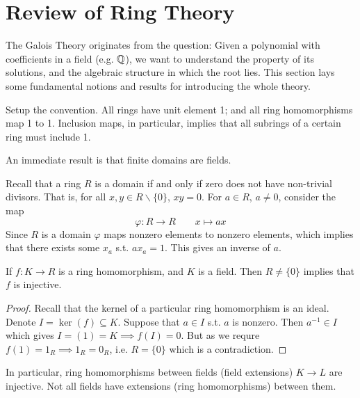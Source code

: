 \documentclass{article}
\begin{document}

\tableofcontents
\newpage

\section{Review of Ring Theory}

\textstart
The Galois Theory originates from the question: Given a polynomial with coefficients in a field (e.g. $\mathbb{Q}$), we want to understand the property of its solutions, and the algebraic structure in which the root lies. This section lays some fundamental notions and results for introducing the whole theory.

Setup the convention. All rings have unit element 1; and all ring homomorphisms map 1 to 1. Inclusion maps, in particular, implies that all subrings of a certain ring must include 1.

\begin{remark}
    An immediate result is that finite domains are fields.

    Recall that a ring $R$ is a domain if and only if zero does not have non-trivial divisors. That is, for all $x, y \in R \smallsetminus \{0\}$, $xy = 0$. For $a \in R$, $a \neq 0$, consider the map 
    \[
        \varphi: R \to R \qquad x \mapsto ax
    \]
    Since $R$ is a domain $\varphi$ maps nonzero elements to nonzero elements, which implies that there exists some $x_a$ s.t. $a x_a = 1$. This gives an inverse of $a$.
\end{remark}

\begin{proposition}
    If $f: K \to R$ is a ring homomorphism, and $K$ is a field. Then $R \neq \{0\}$ implies that $f$ is injective.
\end{proposition}

\begin{proof}
    Recall that the kernel of a particular ring homomorphism is an ideal. Denote $I = \ker (f) \subseteq K$. Suppose that $a \in I$ s.t. $a$ is nonzero. Then $a^{-1} \in I$ which gives $I = (1) = K \implies f(I) = 0$. But as we requre $f(1) = 1_R \implies 1_R = 0_R$, i.e. $R = \{0\}$ which is a contradiction.
\end{proof}

\begin{corollary}
    In particular, ring homomorphisms between fields (field extensions) $K \to L$ are injective. Not all fields have extensions (ring homomorphisms) between them.
\end{corollary}
\end{document}
